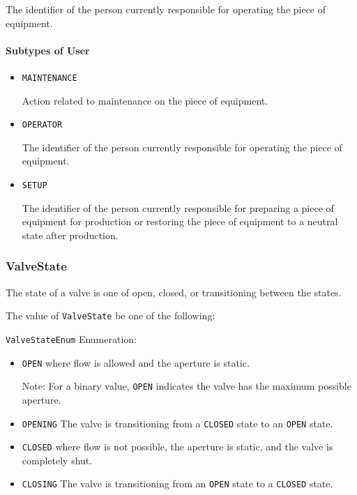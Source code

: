 The identifier of the person currently responsible for operating the piece of equipment.


\paragraph{Subtypes of User}\mbox{}
\label{sec:Subtypes of User}

\begin{itemize}

\item \texttt{MAINTENANCE}


Action related to maintenance on the piece of equipment.

\item \texttt{OPERATOR}


The identifier of the person currently responsible for operating the piece of equipment.

\item \texttt{SET\textunderscore UP}


The identifier of the person currently responsible for preparing a piece of equipment for production or restoring the piece of equipment to a neutral state after production.


\end{itemize}






\subsubsection{ValveState}
\label{sec:ValveState}



The state of a valve is one of open, closed, or transitioning between the states.


The value of \texttt{ValveState} \MUST be one of the following: 


\texttt{ValveStateEnum} Enumeration:

\begin{itemize}
\item \texttt{OPEN} \newline {} where flow is allowed and the aperture is static.

Note: For a binary value, \texttt{OPEN} indicates the valve has the maximum possible aperture. 
\item \texttt{OPENING} \newline The valve is transitioning from a \texttt{CLOSED} state to an \texttt{OPEN} state. 
\item \texttt{CLOSED} \newline {} where flow is not possible, the aperture is static, and the valve is completely shut. 
\item \texttt{CLOSING} \newline The valve is transitioning from an \texttt{OPEN} state to a \texttt{CLOSED} state. 
\end{itemize}


